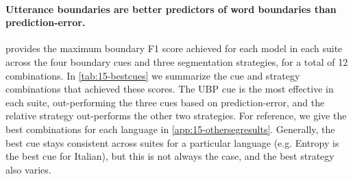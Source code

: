 




\paragraph{Utterance boundaries are better predictors of word boundaries than prediction-error.}
 provides the maximum boundary F1 score achieved for each model in each suite across the four boundary cues and three segmentation strategies, for a total of 12 combinations. In \cref{tab:15-bestcues} we summarize the cue and strategy combinations that achieved these scores. The UBP cue is the most effective in each suite, out-performing the three cues based on prediction-error, and the relative strategy out-performs the other two strategies. For reference, we give the best combinations for each language in \cref{app:15-othersegresults}. Generally, the best cue stays consistent across suites for a particular language (e.g. Entropy is the best cue for Italian), but this is not always the case, and the best strategy also varies. %

